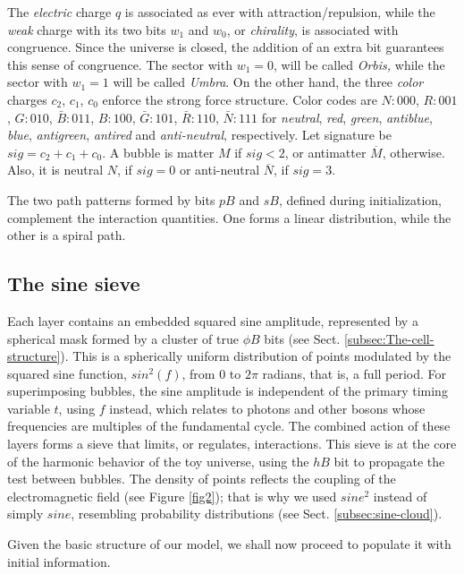 \documentclass[12pt,english]{article}
\begin{document}
The \emph{electric} charge $q$ is associated as ever with attraction/repulsion, while the \emph{weak} charge with its two bits $w_{1}$ and $w_{0}$, or \emph{chirality}, is associated with congruence. Since the universe is closed, the addition of an extra bit guarantees this sense of congruence. The sector with $w_{1}=0$, will be called \emph{Orbis, }while the sector with $w_{1}=1$ will be called \emph{Umbra}. On the other hand, the three \emph{color} charges $c_{2}$, $c_{1}$, $c_{0}$ enforce the strong force structure. Color codes are $N:000$, $R:001$, $G:010$, $\bar{B}:011$, $B:100$, $\bar{G}:101$, $\bar{R}:110$, $\bar{N}:111$ for \emph{neutral}, \emph{red}, \emph{green}, \emph{antiblue}, \emph{blue}, \emph{antigreen}, \emph{antired} and \emph{anti-neutral}, respectively. Let signature be $sig=c_{2}+c_{1}+c_{0}$. A bubble is matter $M$ if $sig<2$, or antimatter $\overline{M}$, otherwise. Also, it is neutral $N$, if $sig=0$ or anti-neutral $\overline{N}$, if $sig=3$.

The two path patterns formed by bits $pB$ and $sB$, defined during initialization,  complement the interaction quantities. One forms a linear distribution, while the other is a spiral path.

\subsection{The sine sieve}\label{subsec:Sine}

Each layer contains an embedded squared sine amplitude, represented by a spherical mask formed by a cluster of true $\phi B$ bits (see Sect. \ref{subsec:The-cell-structure}). This is a spherically uniform distribution of points modulated by the squared sine function, $sin^2(f)$, from $0$ to $2\pi$ radians, that is, a full period. For superimposing bubbles, the sine amplitude is independent of the primary timing variable \( t \), using $f$ instead, which relates to photons and other bosons whose frequencies are multiples of the fundamental cycle. The combined action of these layers forms a sieve that limits, or regulates, interactions. This sieve is at the core of the harmonic behavior of the toy universe, using the $hB$ bit to propagate the test between bubbles. The density of points reflects the coupling of the electromagnetic field  (see Figure \ref{fig2}); that is why we used $sine^2$ instead of simply $sine$, resembling probability distributions (see Sect. \ref{subsec:sine-cloud}).

Given the basic structure of our model, we shall now proceed to populate it with initial information.
\end{document}
